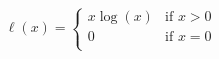 \documentclass{article}
\begin{document}
\begin{align*}
    \label{simple_equation}
    \ell(x) =
    \left\{\begin{array}{lr}
        x \log (x) & \text{if } x > 0\\
        0 & \text{if } x = 0\\
      \end{array} \right.
\end{align*}
\end{document}
